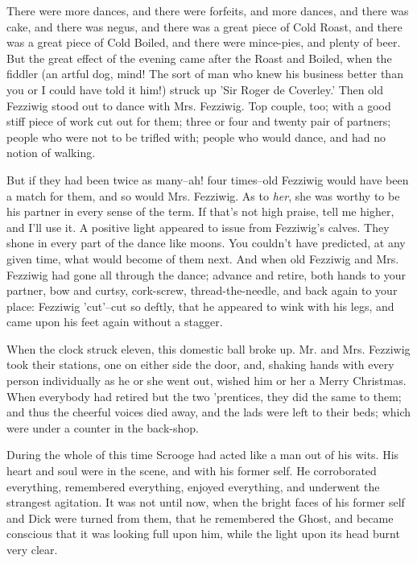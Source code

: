 
There were more dances, and there were forfeits, and more dances, and
there was cake, and there was negus, and there was a great piece of Cold
Roast, and there was a great piece of Cold Boiled, and there were
mince-pies, and plenty of beer. But the great effect of the evening came
after the Roast and Boiled, when the fiddler (an artful dog, mind! The
sort of man who knew his business better than you or I could have told
it him!) struck up 'Sir Roger de Coverley.' Then old Fezziwig stood
out to dance with Mrs. Fezziwig. Top couple, too; with a good stiff
piece of work cut out for them; three or four and twenty pair of
partners; people who were not to be trifled with; people who would
dance, and had no notion of walking.

But if they had been twice as many--ah! four times--old Fezziwig would
have been a match for them, and so would Mrs. Fezziwig. As to \emph{her}, she
was worthy to be his partner in every sense of the term. If that's not
high praise, tell me higher, and I'll use it. A positive light appeared
to issue from Fezziwig's calves. They shone in every part of the dance
like moons. You couldn't have predicted, at any given time, what would
become of them next. And when old Fezziwig and Mrs. Fezziwig had gone
all through the dance; advance and retire, both hands to your partner,
bow and curtsy, cork-screw, thread-the-needle, and back again to your
place: Fezziwig 'cut'--cut so deftly, that he appeared to wink with his
legs, and came upon his feet again without a stagger.

When the clock struck eleven, this domestic ball broke up. Mr. and Mrs.
Fezziwig took their stations, one on either side the door, and, shaking
hands with every person individually as he or she went out, wished him
or her a Merry Christmas. When everybody had retired but the two
'prentices, they did the same to them; and thus the cheerful voices died
away, and the lads were left to their beds; which were under a counter
in the back-shop.

During the whole of this time Scrooge had acted like a man out of his
wits. His heart and soul were in the scene, and with his former self. He
corroborated everything, remembered everything, enjoyed everything, and
underwent the strangest agitation. It was not until now, when the bright
faces of his former self and Dick were turned from them, that he
remembered the Ghost, and became conscious that it was looking full upon
him, while the light upon its head burnt very clear.

